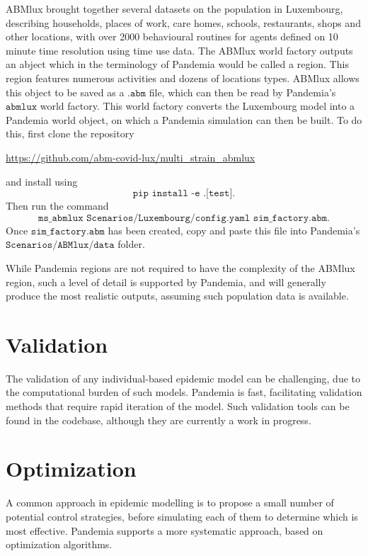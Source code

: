 \documentclass[10pt,letterpaper]{article}
\begin{document}
ABMlux brought together several datasets on the population in Luxembourg, describing households, places of work, care homes, schools, restaurants, shops and other locations, with over 2000 behavioural routines for agents defined on 10 minute time resolution using time use data. The ABMlux world factory outputs an abject which in the terminology of Pandemia would be called a region. This region features numerous activities and dozens of locations types. ABMlux allows this object to be saved as a $\texttt{.abm}$ file, which can then be read by Pandemia's $\texttt{abmlux}$ world factory. This world factory converts the Luxembourg model into a Pandemia world object, on which a Pandemia simulation can then be built. To do this, first clone the repository
\begin{center}
\url{https://github.com/abm-covid-lux/multi_strain_abmlux}
\end{center}
and install using $$\texttt{pip install -e .[test]}.$$ Then run the command
$$\texttt{ms{\_}abmlux Scenarios/Luxembourg/config.yaml sim{\_}factory.abm}.$$ Once $\texttt{sim{\_}factory.abm}$ has been created, copy and paste this file into Pandemia's $\texttt{Scenarios/ABMlux/data}$ folder.

While Pandemia regions are not required to have the complexity of the ABMlux region, such a level of detail is supported by Pandemia, and will generally produce the most realistic outputs, assuming such population data is available.

\section{Validation}

The validation of any individual-based epidemic model can be challenging, due to the computational burden of such models. Pandemia is fast, facilitating validation methods that require rapid iteration of the model. Such validation tools can be found in the codebase, although they are currently a work in progress.

\section{Optimization}

A common approach in epidemic modelling is to propose a small number of potential control strategies, before simulating each of them to determine which is most effective. Pandemia supports a more systematic approach, based on optimization algorithms.
\end{document}
